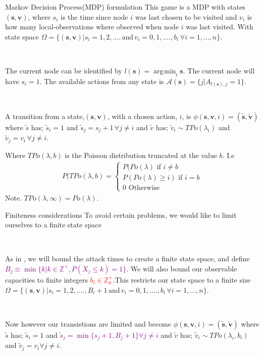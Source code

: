 \documentclass[10pt]{beamer}
\DeclareMathOperator*{\argmin}{\arg\!\min}
\begin{document}
\begin{frame}{Markov Decision Process(MDP) formulation}
This game is a MDP with states $(\bm{s},\bm{v})$, where $s_{i}$ is the time since node $i$ was last chosen to be visited and $v_{i}$ is how many local-observations where observed when node $i$ was last visited. With state space $\Omega=\{(\bm{s},\bm{v}) | s_{i}=1,2,.... \, \text{and}  \, v_{i}=0,1,....,b_{i} \, \forall i=1,...,n  \}$.

\

The current node can be identified by $l(\bm{s})=\argmin_{i} \bm{s}$. The current node will have $s_{i}=1$. The available actions from any state is $\mathcal{A}(\bm{s})=\{j | A_{l(\bm{s}),j}=1 \}$.

\
 
A transition from a state,$(\bm{s},\bm{v})$, with a chosen action, $i$, is $\phi(\bm{s},\bm{v},i)=(\widetilde{\bm{s}},\widetilde{\bm{v}})$ where $\widetilde{s}$ has; $\widetilde{s}_{i}=1$ and $\widetilde{s}_{j}=s_{j}+1 \, \forall j \neq i$ and $\widetilde{v}$ has; $\widetilde{v}_{i} \sim TPo(\lambda_{i})$ and  $\widetilde{v}_{j}=v_{i} \, \forall j \neq i$.

Where $TPo(\lambda,b)$ is the Poisson distribution truncated at the value $b$. I.e
\begin{align*}
P(TPo(\lambda,b)=\begin{cases}
P(Po(\lambda) \text{ if } i \neq b \\
P(Po(\lambda) \geq i) \text{ if } i=b \\
0 \text{ Otherwise}
\end{cases}
\end{align*}
Note. $TPo(\lambda,\infty)=Po(\lambda)$.

\end{frame}

\begin{frame}{Finiteness considerations}
To avoid certain problems, we would like to limit ourselves to a finite state space

\

As in \cite{Lin2013}, we will bound the attack times to create a finite state space, and define \textcolor{purple}{$B_{j} \equiv \min \{ k | k \in \mathbb{Z}^{+} , P(X_{j} \leq k)=1 \}$}. We will also bound our observable capacities to finite integers \textcolor{red}{$b_{i} \in \mathbb{Z}^{+}_{0}$}.This restricts our state space to a finite size
$\Omega=\{(\bm{s},\bm{v}) | s_{i}=1,2,....,B_{i}+1 \, \text{and}  \, v_{i}=0,1,....,b_{i} \, \forall i=1,...,n  \}$.

\

Now however our transistions are limited and become $\phi(\bm{s},\bm{v},i)=(\widetilde{\bm{s}},\widetilde{\bm{v}})$ where $\widetilde{s}$ has; $\widetilde{s}_{i}=1$ and \textcolor{purple}{$\widetilde{s}_{j}=\min \{s_{j}+1,B_{j}+1 \} \forall j \neq i$} and $\widetilde{v}$ has; $\widetilde{v}_{i} \sim TPo(\lambda_{i},b_{i})$ and  $\widetilde{v}_{j}=v_{i} \forall j \neq i$.

\end{frame}
\end{document}
